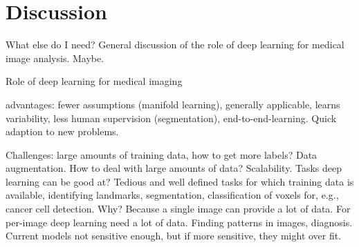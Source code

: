\chapter{Discussion}

What else do I need? General discussion of the role of deep learning for medical
image analysis. Maybe.

Role of deep learning for medical imaging

advantages: fewer assumptions (manifold learning), generally applicable, learns
variability, less human supervision (segmentation), end-to-end-learning. Quick
adaption to new problems.

Challenges: large amounts of training data, how to get more labels? Data
augmentation. How to deal with large amounts of data? Scalability. Tasks deep
learning can be good at? Tedious and well defined tasks for which training data
is available, identifying landmarks, segmentation, classification of voxels for,
e.g., cancer cell detection. Why? Because a single image can provide a lot of
data. For per-image deep learning need a lot of data. Finding patterns in
images, diagnosis. Current models not sensitive enough, but if more sensitive,
they might over fit.
